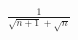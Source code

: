 \documentclass[preview]{standalone}
\begin{document}
\begin{align*}
\frac{1}{ \sqrt{n+1} + \sqrt{n} }
\end{align*}
\end{document}
